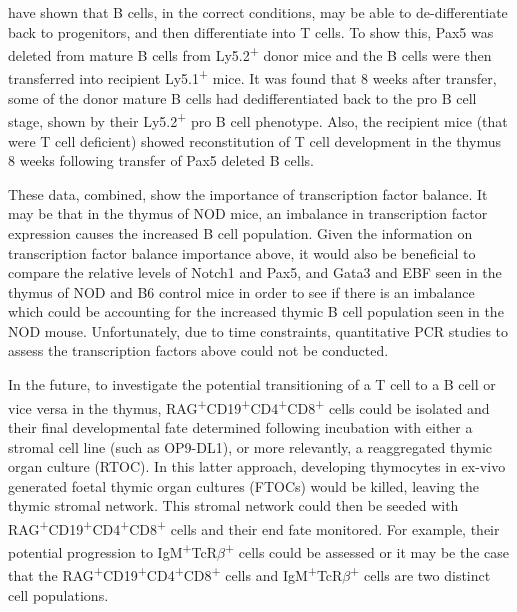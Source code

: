 \citet{Cobaleda2007} have shown that B cells, in the correct conditions, may be able to de-differentiate back to progenitors, and then differentiate into T cells.
To show this, Pax5 was deleted from mature B cells from Ly5.2\textsuperscript{+} donor mice and the B cells were then transferred into recipient Ly5.1\textsuperscript{+} mice.
It was found that 8 weeks after transfer, some of the donor mature B cells had dedifferentiated back to the pro B cell stage, shown by their Ly5.2\textsuperscript{+} pro B cell phenotype.
Also, the recipient mice (that were T cell deficient) showed reconstitution of T cell development in the thymus 8 weeks following transfer of Pax5 deleted B cells.

These data, combined, show the importance of transcription factor balance.
It may be that in the thymus of NOD mice, an imbalance in transcription factor expression causes the increased B cell population.
Given the information on transcription factor balance importance above, it would also be beneficial to compare the relative levels of Notch1 and Pax5, and Gata3 and EBF seen in the thymus of NOD and B6 control mice in order to see if there is an imbalance which could be accounting for the increased thymic B cell population seen in the NOD mouse.
Unfortunately, due to time constraints, quantitative PCR studies to assess the transcription factors above could not be conducted.


In the future, to investigate the potential transitioning of a T cell to a B cell or vice versa in the thymus, RAG\textsuperscript{+}CD19\textsuperscript{+}CD4\textsuperscript{+}CD8\textsuperscript{+} cells could be isolated and their final developmental fate determined following incubation with either a stromal cell line (such as OP9-DL1), or more relevantly, a reaggregated thymic organ culture (RTOC).
In this latter approach, developing thymocytes in ex-vivo generated foetal thymic organ cultures (FTOCs) would be killed, leaving the thymic stromal network.
This stromal network could then be seeded with RAG\textsuperscript{+}CD19\textsuperscript{+}CD4\textsuperscript{+}CD8\textsuperscript{+} cells and their end fate monitored.
For example, their potential progression to IgM\textsuperscript{+}TcR$\beta$\textsuperscript{+} cells could be assessed or it may be the case that the RAG\textsuperscript{+}CD19\textsuperscript{+}CD4\textsuperscript{+}CD8\textsuperscript{+} cells and IgM\textsuperscript{+}TcR$\beta$\textsuperscript{+} cells are two distinct cell populations.


